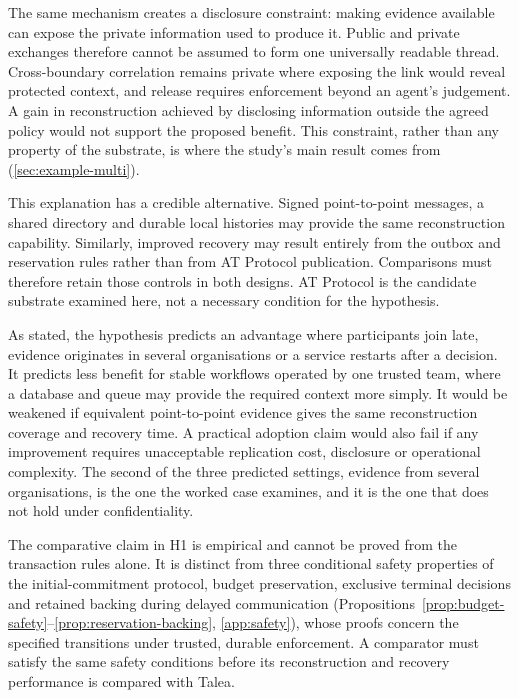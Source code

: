 The same mechanism creates a disclosure constraint: making evidence available can expose the private information used to produce it. Public and private exchanges therefore cannot be assumed to form one universally readable thread. Cross-boundary correlation remains private where exposing the link would reveal protected context, and release requires enforcement beyond an agent's judgement. A gain in reconstruction achieved by disclosing information outside the agreed policy would not support the proposed benefit. This constraint, rather than any property of the substrate, is where the study's main result comes from (\cref{sec:example-multi}).

This explanation has a credible alternative. Signed point-to-point messages, a shared directory and durable local histories may provide the same reconstruction capability. Similarly, improved recovery may result entirely from the outbox and reservation rules rather than from AT Protocol publication. Comparisons must therefore retain those controls in both designs. AT Protocol is the candidate substrate examined here, not a necessary condition for the hypothesis.

As stated, the hypothesis predicts an advantage where participants join late, evidence originates in several organisations or a service restarts after a decision. It predicts less benefit for stable workflows operated by one trusted team, where a database and queue may provide the required context more simply. It would be weakened if equivalent point-to-point evidence gives the same reconstruction coverage and recovery time. A practical adoption claim would also fail if any improvement requires unacceptable replication cost, disclosure or operational complexity. The second of the three predicted settings, evidence from several organisations, is the one the worked case examines, and it is the one that does not hold under confidentiality.

The comparative claim in H1 is empirical and cannot be proved from the transaction rules alone. It is distinct from three conditional safety properties of the initial-commitment protocol, budget preservation, exclusive terminal decisions and retained backing during delayed communication (Propositions~\ref{prop:budget-safety}--\ref{prop:reservation-backing}, \cref{app:safety}), whose proofs concern the specified transitions under trusted, durable enforcement. A comparator must satisfy the same safety conditions before its reconstruction and recovery performance is compared with Talea.
